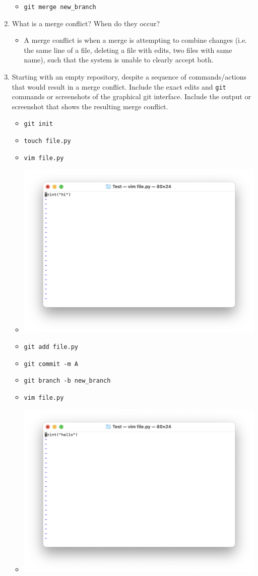 \documentclass[10pt,twocolumn]{article}
\begin{document}
\begin{enumerate}
        \begin{itemize}
            \item \texttt{git merge new\_branch}
        \end{itemize}
    \item What is a merge conflict? When do they occur?
        \begin{itemize}
            \item A merge conflict is when a merge is attempting to combine changes (i.e. the same line of a file, deleting a file with edits, two files with same name), such that the system is unable to clearly accept both.
        \end{itemize}
    \item Starting with an empty repository, despite a sequence of commands/actions that would result in a merge conflict. Include the exact edits and \texttt{git} commands or screenshots of the graphical git interface. Include the output or screenshot that shows the resulting merge conflict.
        \begin{itemize}
            \item \texttt{git init}
            \item \texttt{touch file.py}
            \item \texttt{vim file.py}
            \item \includegraphics[width=0.5\linewidth]{Images/1.png}
            \item \texttt{git add file.py}
            \item \texttt{git commit -m A}
            \item \texttt{git branch -b new\_branch}
            \item \texttt{vim file.py}
            \item \includegraphics[width=0.5\linewidth]{Images/2.png}

\end{itemize}
\end{enumerate}
\end{document}
